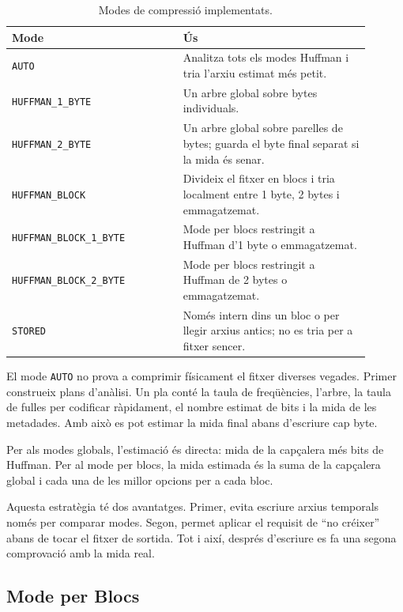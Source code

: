 \documentclass[conference,compsoc]{IEEEtran}
\begin{document}
\begin{table}[H]
\centering
\caption{Modes de compressió implementats.}
\label{tab:modes}
\footnotesize
\begin{tabular}{@{}p{0.43\linewidth}p{0.47\linewidth}@{}}
\toprule
\textbf{Mode} & \textbf{Ús} \\
\midrule
\texttt{AUTO} & Analitza tots els modes Huffman i tria l'arxiu estimat més petit. \\
\texttt{HUFFMAN\_1\_BYTE} & Un arbre global sobre bytes individuals. \\
\texttt{HUFFMAN\_2\_BYTE} & Un arbre global sobre parelles de bytes; guarda el byte final separat si la mida és senar. \\
\texttt{HUFFMAN\_BLOCK} & Divideix el fitxer en blocs i tria localment entre 1 byte, 2 bytes i emmagatzemat. \\
\texttt{HUFFMAN\_BLOCK\_1\_BYTE} & Mode per blocs restringit a Huffman d'1 byte o emmagatzemat. \\
\texttt{HUFFMAN\_BLOCK\_2\_BYTE} & Mode per blocs restringit a Huffman de 2 bytes o emmagatzemat. \\
\texttt{STORED} & Només intern dins un bloc o per llegir arxius antics; no es tria per a fitxer sencer. \\
\bottomrule
\end{tabular}
\end{table}

El mode \texttt{AUTO} no prova a comprimir físicament el fitxer diverses
vegades. Primer construeix plans d'anàlisi. Un pla conté la taula de
freqüències, l'arbre, la taula de fulles per codificar ràpidament, el
nombre estimat de bits i la mida de les metadades. Amb això es pot
estimar la mida final abans d'escriure cap byte.

Per als modes globals, l'estimació és directa: mida de la capçalera més
bits de Huffman. Per al mode per blocs, la mida
estimada és la suma de la capçalera global i cada una de les millor opcions per a cada bloc.

Aquesta estratègia té dos avantatges. Primer, evita escriure arxius
temporals només per comparar modes. Segon, permet aplicar el requisit de
``no créixer'' abans de tocar el fitxer de sortida. Tot i així, després
d'escriure es fa una segona comprovació amb la mida real.

\subsection{Mode per Blocs}
\end{document}
